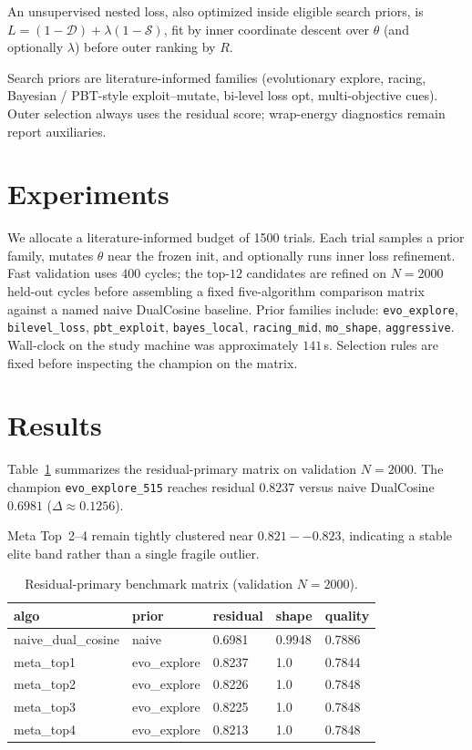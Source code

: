 \documentclass[11pt,a4paper]{article}
\begin{document}
An unsupervised nested loss, also optimized inside eligible search priors, is
$L=(1-\mathcal{D})+\lambda(1-\mathcal{S})$, fit by inner coordinate descent over $\theta$ (and optionally $\lambda$) before outer ranking by $R$.

Search priors are literature-informed families (evolutionary explore, racing, Bayesian / PBT-style exploit--mutate, bi-level loss opt, multi-objective cues). Outer selection always uses the residual score; wrap-energy diagnostics remain report auxiliaries.

\section{Experiments}
We allocate a literature-informed budget of 1500 trials. Each trial samples a prior family, mutates $\theta$ near the frozen init, and optionally runs inner loss refinement. Fast validation uses $400$ cycles; the top-$12$ candidates are refined on $N=2000$ held-out cycles before assembling a fixed five-algorithm comparison matrix against a named naive DualCosine baseline. Prior families include: \texttt{evo\_explore}, \texttt{bilevel\_loss}, \texttt{pbt\_exploit}, \texttt{bayes\_local}, \texttt{racing\_mid}, \texttt{mo\_shape}, \texttt{aggressive}. Wall-clock on the study machine was approximately $141$\,s. Selection rules are fixed before inspecting the champion on the matrix.

\section{Results}
Table~\ref{tab:benchmark} summarizes the residual-primary matrix on validation $N=2000$. The champion \texttt{evo\_explore\_515} reaches residual $0.8237$ versus naive DualCosine $0.6981$ ($\Delta\approx 0.1256$).

Meta Top~2--4 remain tightly clustered near $0.821--0.823$, indicating a stable elite band rather than a single fragile outlier.

\begin{table}[htbp]
\centering
\caption{Residual-primary benchmark matrix (validation $N{=}2000$).}
\label{tab:benchmark}
\begin{tabular}{lllll}
\toprule
algo & prior & residual & shape & quality \\
\midrule
naive\_dual\_cosine & naive & 0.6981 & 0.9948 & 0.7886 \\
meta\_top1 & evo\_explore & 0.8237 & 1.0 & 0.7844 \\
meta\_top2 & evo\_explore & 0.8226 & 1.0 & 0.7848 \\
meta\_top3 & evo\_explore & 0.8225 & 1.0 & 0.7848 \\
meta\_top4 & evo\_explore & 0.8213 & 1.0 & 0.7848 \\
\bottomrule
\end{tabular}
\end{table}
\end{document}
